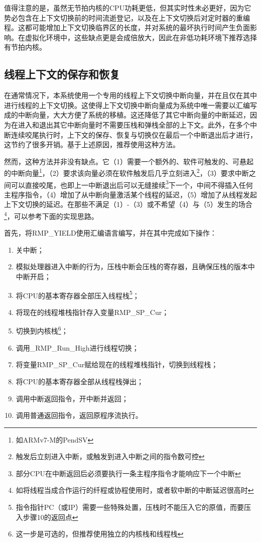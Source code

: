 值得注意的是，虽然无节拍内核的CPU功耗更低，但其实时性未必更好，因为它势必包含在上下文切换前的时间流逝登记，以及在上下文切换后对定时器的重编程。这都可能增加上下文切换临界区的长度，并对系统的最坏执行时间产生负面影响。在虚拟化环境中，这些缺点更是会成倍放大，因此在非低功耗环境下推荐选择有节拍内核。

\subsection{线程上下文的保存和恢复}\label{subsec:saving-and-restoring-thread-context}

\protect{}\label{subsec:saving-and-restoring-thread-context-2}在通常情况下，本系统使用一个专用的线程上下文切换中断向量，并在且仅在其中进行线程的上下文切换。这使得上下文切换中断向量成为系统中唯一需要以汇编写成的中断向量，大大方便了系统的移植。这还降低了其它中断向量的中断延迟，因为在进入和退出其它中断向量时不需要压栈和弹栈全部的上下文。此外，在多个中断连续咬尾执行时，上下文的保存、恢复与切换仅在最后一个中断退出后才进行，这节约了很多开销。基于上述原因，推荐使用这种方法。

然而，这种方法并非没有缺点。它（1）需要一个额外的、软件可触发的、可悬起的中断向量\footnote{如ARMv7-M的PendSV}，（2）要求该向量必须在软件触发后几乎立刻进入\footnote{触发后立刻进入中断，或触发到进入中断之间的指令数可控}，（3）要求中断之间可以直接咬尾，也即上一中断退出后可以无缝接续\footnote{部分CPU在中断返回后必须要执行一条主程序指令才能响应下一个中断}下一个，中间不得插入任何主程序指令，（4）增加了从中断向量激活某个线程的延迟，（5）增加了从线程发起上下文切换的延迟。在那些不满足（1）-（3）或不希望（4）与（5）发生的场合\footnote{如将线程当成合作运行的纤程或协程使用时，或者软中断的中断延迟很高时}，可以参考下面的实现思路。

首先，将RMP\_YIELD使用汇编语言编写，并在其中完成如下操作：

\begin{enumerate}
\def\labelenumi{\arabic{enumi}.}
\item
  关中断；
\item
  模拟处理器进入中断的行为，压栈中断会压栈的寄存器，且确保压栈的版本中中断开启；
\item
  将CPU的基本寄存器全部压入线程栈\footnote{指令指针PC（或IP）需要一些特殊处置，压栈时不能压入它的原值，而要压入步骤10的返回点}；
\item
  将现在的线程堆栈指针存入变量RMP\_SP\_Cur；
\item
  切换到内核栈\footnote{这一步是可选的，但推荐使用独立的内核栈和线程栈}；
\item
  调用\_RMP\_Run\_High进行线程切换；
\item
  将变量RMP\_SP\_Cur赋给现在的线程堆栈指针，切换到线程栈；
\item
  将CPU的基本寄存器全部从线程栈弹出；
\item
  调用中断返回指令，开中断并返回；
\item
  调用普通返回指令，返回原程序流执行。
\end{enumerate}

